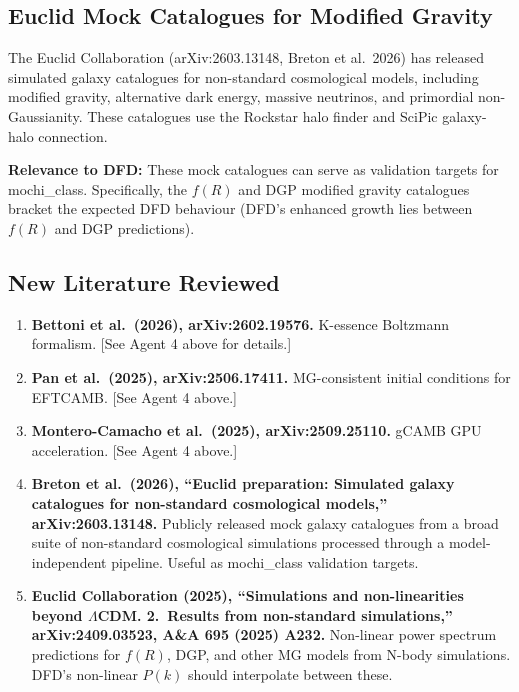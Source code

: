 \documentclass[11pt]{article}
\begin{document}
\subsection{Euclid Mock Catalogues for Modified Gravity}

The Euclid Collaboration (arXiv:2603.13148, Breton et al.\ 2026)
has released simulated galaxy catalogues for non-standard cosmological
models, including modified gravity, alternative dark energy, massive
neutrinos, and primordial non-Gaussianity. These catalogues use the
Rockstar halo finder and SciPic galaxy-halo connection.

\textbf{Relevance to DFD:} These mock catalogues can serve as
validation targets for mochi\_class. Specifically, the $f(R)$ and
DGP modified gravity catalogues bracket the expected DFD behaviour
(DFD's enhanced growth lies between $f(R)$ and DGP predictions).

\subsection{New Literature Reviewed}

\begin{tcolorbox}[colback=green!5!white, colframe=green!50!black,
  title=\textbf{Agent 9: NEW LITERATURE REVIEWED}]

\begin{enumerate}

\item \textbf{Bettoni et al.\ (2026), arXiv:2602.19576.}
  K-essence Boltzmann formalism. [See Agent 4 above for details.]

\item \textbf{Pan et al.\ (2025), arXiv:2506.17411.}
  MG-consistent initial conditions for EFTCAMB. [See Agent 4 above.]

\item \textbf{Montero-Camacho et al.\ (2025), arXiv:2509.25110.}
  gCAMB GPU acceleration. [See Agent 4 above.]

\item \textbf{Breton et al.\ (2026), ``Euclid preparation: Simulated
  galaxy catalogues for non-standard cosmological models,''
  arXiv:2603.13148.}
  Publicly released mock galaxy catalogues from a broad suite of
  non-standard cosmological simulations processed through a
  model-independent pipeline. Useful as mochi\_class validation targets.

\item \textbf{Euclid Collaboration (2025), ``Simulations and
  non-linearities beyond $\Lambda$CDM. 2.\ Results from non-standard
  simulations,'' arXiv:2409.03523, A\&A 695 (2025) A232.}
  Non-linear power spectrum predictions for $f(R)$, DGP, and other
  MG models from N-body simulations. DFD's non-linear $P(k)$ should
  interpolate between these.

\end{enumerate}
\end{tcolorbox}
\end{document}
